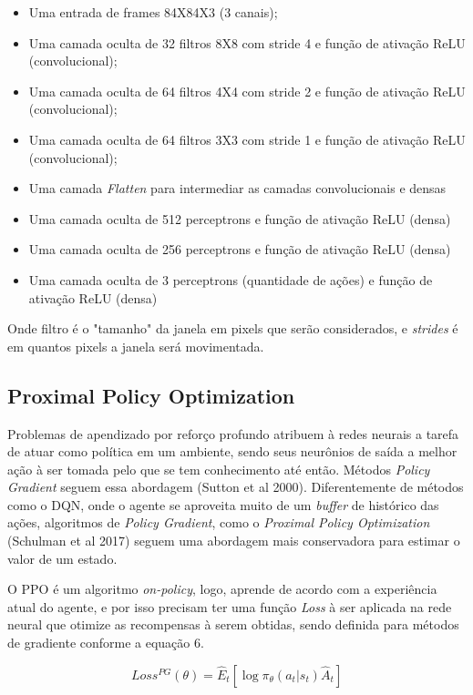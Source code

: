 \documentclass[letterpaper]{article} %
\begin{document}
\begin{itemize}
	\item Uma entrada de frames 84X84X3 (3 canais);
	\item Uma camada oculta de 32 filtros 8X8 com stride 4 e função de ativação ReLU (convolucional);
	\item Uma camada oculta de 64 filtros 4X4 com stride 2 e função de ativação ReLU (convolucional);
	\item Uma camada oculta de 64 filtros 3X3 com stride 1 e função de ativação ReLU (convolucional);
	\item Uma camada \textit{Flatten} para intermediar as camadas convolucionais e densas
	\item Uma camada oculta de 512 perceptrons e função de ativação ReLU (densa)
	\item Uma camada oculta de 256 perceptrons e função de ativação ReLU (densa)
	\item Uma camada oculta de 3 perceptrons (quantidade de ações) e função de ativação ReLU (densa)
\end{itemize}

Onde filtro é o "tamanho" da janela em pixels que serão considerados, e \textit{strides} é em quantos pixels a janela será movimentada.

\subsection{Proximal Policy Optimization}
Problemas de apendizado por reforço profundo atribuem à redes neurais a tarefa de atuar como política em um ambiente, sendo seus neurônios de saída a melhor ação à ser tomada pelo que se tem conhecimento até então. Métodos \textit{Policy Gradient} seguem essa abordagem (Sutton et al 2000). Diferentemente de métodos como o DQN, onde o agente se aproveita muito de um \textit{buffer} de histórico das ações, algoritmos de \textit{Policy Gradient}, como o \textit{Proximal Policy Optimization} (Schulman et al 2017) seguem uma abordagem mais conservadora para estimar o valor de um estado. 

O PPO é um algoritmo \textit{on-policy}, logo, aprende de acordo com a experiência atual do agente, e por isso precisam ter uma função \textit{Loss} à ser aplicada na rede neural que otimize as recompensas à serem obtidas, sendo definida para métodos de gradiente conforme a equação 6.

\begin{equation}
Loss^{PG}(\theta) =  \hat{E}_t[\log \pi_{\theta}(a_t | s_t) \hat{A}_t]
\end{equation}
\end{document}
